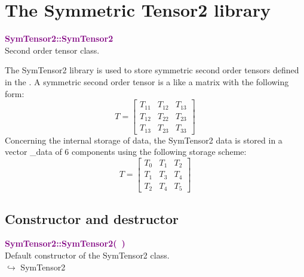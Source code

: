 \section{The Symmetric Tensor2 library}

\textcolor{purple}{\textbf{SymTensor2::SymTensor2}}\label{SymTensor2::SymTensor2}\\
Second order tensor class.

The SymTensor2 library is used to store symmetric second order tensors defined in the \DynELA. A symmetric second order tensor is a like a matrix with the following form:
\begin{equation*}
T=\left[\begin{array}{ccc}
  T_{11} & T_{12} & T_{13}\\
  T_{12} & T_{22} & T_{23}\\
  T_{13} & T_{23} & T_{33}
  \end{array}\right]
\end{equation*}
Concerning the internal storage of data, the SymTensor2 data is stored in a vector \_data of 6 components using the following storage scheme:
\begin{equation*}
T=\left[\begin{array}{ccc}
    T_{0} & T_{1} & T_{2}\\
    T_{1} & T_{3} & T_{4}\\
    T_{2} & T_{4} & T_{5}
    \end{array}\right]
\end{equation*}

\subsection{Constructor and destructor}

\textcolor{purple}{\textbf{SymTensor2::SymTensor2(~)}}\label{SymTensor2::SymTensor2()}\\
Default constructor of the SymTensor2 class.\\ \hspace*{10mm}$\hookrightarrow$ SymTensor2

